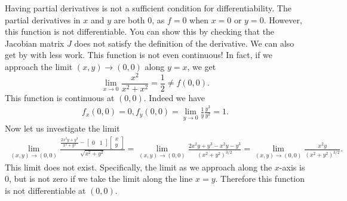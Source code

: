 Having partial derivatives is not a sufficient condition for differentiability.
The partial derivatives in $x$ and $y$ are both $0$, as $f=0$ when $x=0$ or $y=0$. However, this function is not differentiable. You can show this by checking that the Jacobian matrix $J$ does not satisfy the definition of the derivative. We can also get by with less work. This function is not even continuous! In fact, if we approach the limit $(x,y)\to(0,0)$ along $y=x$,
we get \[
\lim_{x\to 0 }\frac{x^2}{x^2+x^2} = \frac{1}{2}\neq f(0,0).
\]
This function is continuous at $(0,0)$. Indeed we have \begin{align*}
    f_x(0,0) = 0, f_y(0,0)= \lim_{y\to 0 } \frac{1}{y}\frac{y^3}{y^2}=1.
\end{align*}
Now let us investigate the limit \begin{align*}
    \lim_{(x,y)\to(0,0)}\frac{\frac{2x^2y+y^3}{x^2+y^2} - \begin{bmatrix}
        0&1
    \end{bmatrix}\begin{bmatrix}
        x\\y
    \end{bmatrix}}{\sqrt{x^2+y^2}}
    =\lim_{(x,y)\to(0,0)}\frac{2x^2y+y^3-x^2y-y^3}{(x^2+y^2)^{3/2}}=
    \lim_{(x,y)\to(0,0)}\frac{x^2y}{(x^2+y^2)^{3/2}}.
\end{align*}
This limit does not exist. Specifically, the limit as we approach along the $x$-axis is $0$, but is not zero if we take the limit along the line $x=y$. Therefore this function is not differentiable at $(0,0)$.

